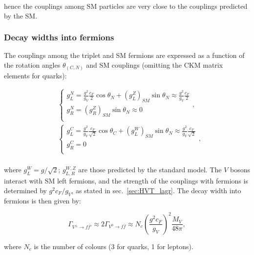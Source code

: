\noindent hence the couplings among SM particles are very close to the couplings predicted by the SM.

\subsubsection{Decay widths into fermions}
\label{sec:HVT_decay_fermions}

The couplings among the triplet and SM fermions are expressed as a function of the rotation angles $\theta_{(C,N)}$ and SM couplings (omitting the CKM matrix elements for quarks):

\begin{equation}
\begin{split}
&
\left\{
\begin{array}{l}
g_L^N = \frac{g^2}{g_V} \frac{c_F}{2} \cos{{\theta}_N} + \left( g_L^Z \right)_{SM} \sin{{\theta}_N} \approx \frac{g^2}{g_V} \frac{c_F}{2} \\
g_R^N = \left( g_R^Z \right)_{SM} \sin{{\theta}_N} \approx 0\\
\end{array}
\right.
,\\
&
\left\{
\begin{array}{l}
g_L^C = \frac{g^2}{g_V} \frac{c_F}{\sqrt{2}} \cos{{\theta}_C} + \left( g_L^W \right)_{SM} \sin{{\theta}_N} \approx \frac{g^2}{g_V} \frac{c_F}{\sqrt{2}} \\
g_R^C = 0\\
\end{array}
\right.
,\\
\end{split}
\label{eq:HVT_couplings}
\end{equation}

\noindent where $g_L^W = g/\sqrt{2}$; $g_{L,R}^{W,Z}$ are those predicted by the standard model. The $V$ bosons interact with SM left fermions, and the strength of the couplings with fermions is determined by $g^2 c_F/g_V$, as stated in sec.~\ref{sec:HVT_lagr}. The decay width into fermions is then given by:

\begin{equation}
\Gamma_{V^{\pm} \rightarrow f \bar{f'}} \approx 2 \Gamma_{V^{0} \rightarrow f \bar{f}} \approx N_c {\left( \frac{g^2 c_F}{g_V}\right)}^2 \frac{M_V}{48 \pi},
\label{eq:HVT_width_fermions}
\end{equation}

\noindent where $N_c$ is the number of colours (3 for quarks, 1 for leptons).

